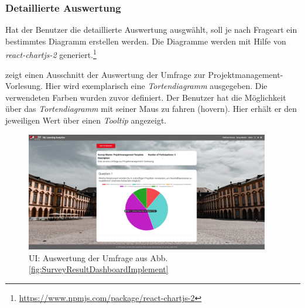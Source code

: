 \subsubsection*{Detaillierte Auswertung}
Hat der Benutzer die detaillierte Auswertung ausgwählt, soll je nach Frageart ein bestimmtes Diagramm erstellen werden. 
Die Diagramme werden mit Hilfe von \emph{react-chartjs-2} generiert.\footnote{\url{https://www.npmjs.com/package/react-chartjs-2}} 

\abb {} zeigt einen Ausschnitt der Auswertung der Umfrage zur Projektmanagement-Vorlesung. 
Hier wird exemplarisch eine \emph{Tortendiagramm} ausgegeben. 
Die verwendeten Farben wurden zuvor definiert. 
Der Benutzer hat die Möglichkeit über das \emph{Tortendiagramm} mit seiner Maus zu fahren (hovern).
Hier erhält er den jeweiligen Wert über einen \emph{Tooltip} angezeigt.

\begin{figure}[hp]
	\centering
	\includegraphics[width=0.95\textwidth, keepaspectratio]{img/client/SurveyResultDetail2.png}
	\captionsetup{justification=centering, format=plain}
	\caption[\acf{UI}: Auswertung der Umfrage]{\acf{UI}: Auswertung der Umfrage aus Abb. \vref{fig:SurveyResultDashboardImplement} \\ \quelleScreenshot}
	\label{fig:SurveyResultDetailImplement}
\end{figure}
